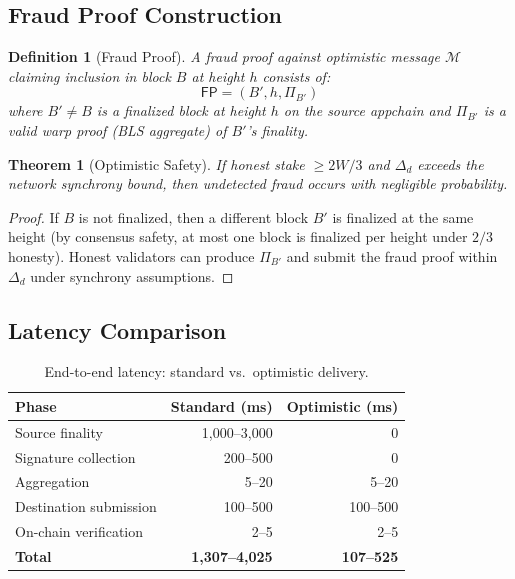 \documentclass[11pt,a4paper]{article}
\newtheorem{theorem}{Theorem}
\newtheorem{definition}{Definition}
\begin{document}
\subsection{Fraud Proof Construction}

\begin{definition}[Fraud Proof]
A fraud proof against optimistic message $\mathcal{M}$ claiming inclusion in block $B$ at height $h$ consists of:
\begin{equation}
    \mathsf{FP} = (B', h, \Pi_{B'})
\end{equation}
where $B' \neq B$ is a finalized block at height $h$ on the source appchain and $\Pi_{B'}$ is a valid warp proof (BLS aggregate) of $B'$'s finality.
\end{definition}

\begin{theorem}[Optimistic Safety]
If honest stake $\geq 2W/3$ and $\Delta_d$ exceeds the network synchrony bound, then undetected fraud occurs with negligible probability.
\end{theorem}

\begin{proof}
If $B$ is not finalized, then a different block $B'$ is finalized at the same height (by consensus safety, at most one block is finalized per height under $2/3$ honesty). Honest validators can produce $\Pi_{B'}$ and submit the fraud proof within $\Delta_d$ under synchrony assumptions.
\end{proof}

\subsection{Latency Comparison}

\begin{table}[H]
\centering
\caption{End-to-end latency: standard vs.\ optimistic delivery.}
\label{tab:latency}
\begin{tabular}{lrr}
\toprule
\textbf{Phase} & \textbf{Standard (ms)} & \textbf{Optimistic (ms)} \\
\midrule
Source finality & 1{,}000--3{,}000 & 0 \\
Signature collection & 200--500 & 0 \\
Aggregation & 5--20 & 5--20 \\
Destination submission & 100--500 & 100--500 \\
On-chain verification & 2--5 & 2--5 \\
\midrule
\textbf{Total} & \textbf{1{,}307--4{,}025} & \textbf{107--525} \\
\bottomrule
\end{tabular}
\end{table}
\end{document}

